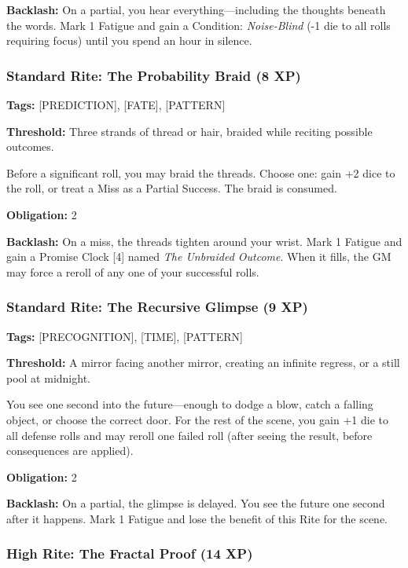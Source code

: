 \textbf{Backlash:} On a partial, you hear everything—including the thoughts beneath the words. Mark 1 Fatigue and gain a Condition: \textit{Noise-Blind} (-1 die to all rolls requiring focus) until you spend an hour in silence.

\subsubsection{Standard Rite: The Probability Braid (8 XP)}

\textbf{Tags:} [PREDICTION], [FATE], [PATTERN]

\textbf{Threshold:} Three strands of thread or hair, braided while reciting possible outcomes.

Before a significant roll, you may braid the threads. Choose one: gain +2 dice to the roll, or treat a Miss as a Partial Success. The braid is consumed.

\textbf{Obligation:} 2

\textbf{Backlash:} On a miss, the threads tighten around your wrist. Mark 1 Fatigue and gain a Promise Clock [4] named \textit{The Unbraided Outcome}. When it fills, the GM may force a reroll of any one of your successful rolls.

\subsubsection{Standard Rite: The Recursive Glimpse (9 XP)}

\textbf{Tags:} [PRECOGNITION], [TIME], [PATTERN]

\textbf{Threshold:} A mirror facing another mirror, creating an infinite regress, or a still pool at midnight.

You see one second into the future—enough to dodge a blow, catch a falling object, or choose the correct door. For the rest of the scene, you gain +1 die to all defense rolls and may reroll one failed roll (after seeing the result, before consequences are applied).

\textbf{Obligation:} 2

\textbf{Backlash:} On a partial, the glimpse is delayed. You see the future one second after it happens. Mark 1 Fatigue and lose the benefit of this Rite for the scene.

\subsubsection{High Rite: The Fractal Proof (14 XP)}

